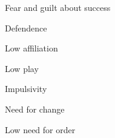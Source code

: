 \documentclass[aspectratio=169]{beamer}
\begin{document}
\begin{frame}
  \begin{center}
    \Huge Fear and guilt about success
    \\ \small \cite{sakulku11}
  \end{center}
\end{frame}

\begin{frame}
  \begin{center}
    \Huge Defendence
    \\ \small \cite{langford93}
  \end{center}
\end{frame}

\begin{frame}
  \begin{center}
    \Huge Low affiliation
    \\ \small \cite{langford93}
  \end{center}
\end{frame}

\begin{frame}
  \begin{center}
    \Huge Low play
    \\ \small \cite{langford93}
  \end{center}
\end{frame}

\begin{frame}
  \begin{center}
    \Huge Impulsivity
    \\ \small \cite{langford93}
  \end{center}
\end{frame}

\begin{frame}
  \begin{center}
    \Huge Need for change
    \\ \small \cite{langford93}
  \end{center}
\end{frame}

\begin{frame}
  \begin{center}
    \Huge Low need for order
    \\ \small \cite{langford93}
  \end{center}
\end{frame}
\end{document}
